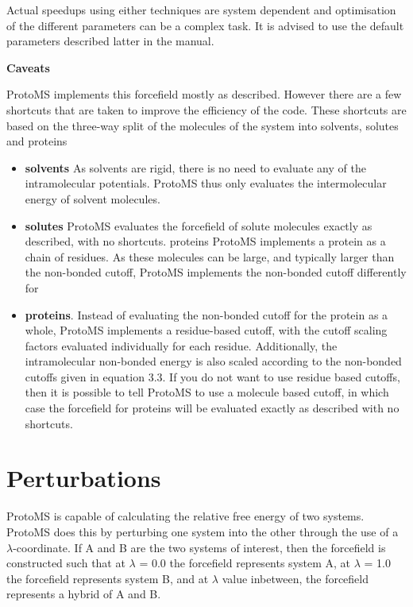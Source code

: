 \documentclass[letterpaper,10pt,english]{sphinxmanual}
\begin{document}
Actual speedups using either techniques are system dependent and optimisation of the different parameters can be a complex task. It is advised to use the default parameters described latter in the manual.

\textbf{Caveats}

ProtoMS implements this forcefield mostly as described. However there are a few shortcuts that are taken to improve the efficiency of the code. These shortcuts are based on the three-way split of the molecules of the system into solvents, solutes and proteins
\begin{itemize}
\item {} 
\textbf{solvents} As solvents are rigid, there is no need to evaluate any of the intramolecular potentials. ProtoMS thus only evaluates the intermolecular energy of solvent molecules.

\item {} 
\textbf{solutes} ProtoMS evaluates the forcefield of solute molecules exactly as described, with no shortcuts. proteins ProtoMS implements a protein as a chain of residues. As these molecules can be large, and typically larger than the non-bonded cutoff, ProtoMS implements the non-bonded cutoff differently for

\item {} 
\textbf{proteins}. Instead of evaluating the non-bonded cutoff for the protein as a whole, ProtoMS implements a residue-based cutoff, with the cutoff scaling factors evaluated individually for each residue. Additionally, the intramolecular non-bonded energy is also scaled according to the non-bonded cutoffs given in equation 3.3. If you do not want to use residue based cutoffs, then it is possible to tell ProtoMS to use a molecule based cutoff, in which case the forcefield for proteins will be evaluated exactly as described with no shortcuts.

\end{itemize}


\section{Perturbations}
\label{protoms:perturbations}
ProtoMS is capable of calculating the relative free energy of two systems. ProtoMS does this by perturbing one system into the other through the use of a \(\lambda\)-coordinate. If A and B are the two systems of interest, then the forcefield is constructed such that at \(\lambda\) = 0.0 the forcefield represents system A, at \(\lambda\) = 1.0 the forcefield represents system B, and at \(\lambda\) value inbetween, the forcefield represents a hybrid of A and B.
\end{document}
